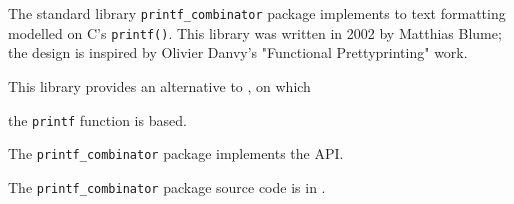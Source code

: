 
The standard library {\tt printf\_combinator} package implements to text formatting 
modelled on C's {\tt printf()}.  This library was written in 2002 by Matthias Blume; 
the design is inspired by Olivier Danvy's "Functional Prettyprinting" work.

This library provides an alternative to , on which 

the  {\tt printf} function is based.

The {\tt printf\_combinator} package implements the  API.

The {\tt printf\_combinator} package source code is in .


